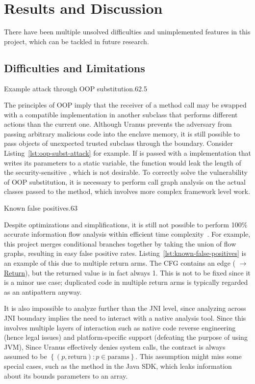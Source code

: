 \section{Results and Discussion}\label{sec:results-and-discussion}
There have been multiple unsolved difficulties and unimplemented features in this project,
which can be tackled in future research.

\subsection{Difficulties and Limitations}\label{subsec:difficulties-and-limitations}
{Example attack through OOP substitution}{.6}{2.5}

The principles of \ac{OOP} imply that the receiver of a method call
may be swapped with a compatible implementation in another subclass
that performs different actions than the current one.
Although Uranus prevents the adversary
from passing arbitrary malicious code into the enclave memory,
it is still possible to pass objects of unexpected trusted subclass
through the  boundary.
Consider Listing~\ref{lst:oop-subst-attack} for example.
If  is passed with a  implementation
that writes its parameters to a static variable,
the function would leak the length of the security-sensitive ,
which is not desirable.
To correctly solve the vulnerability of \ac{OOP} substitution,
it is necessary to perform call graph analysis on the actual classes passed to the method,
which involves more complex framework level work.

{Known false positives}{.6}{3}

Despite optimizations and simplifications,
it is still not possible to perform 100\% accurate information flow analysis
within efficient time complexity~\cite{SmithGeoffrey2007PoSI}.
For example, this project merges conditional branches together
by taking the union of flow graphs,
resulting in easy false positive rates.
Listing~\ref{lst:known-false-positives} is an example of this  due to multiple return arms.
The CFG contains an edge ( $\to$ \underline{Return}),
but the returned value is in fact always 1.
This is not to be fixed since it is a minor use case;
duplicated code in multiple return arms
is typically regarded as an antipattern anyway.

It is also impossible to analyze further than the \ac{JNI} level,
since analyzing across \ac{JNI} boundary implies
the need to interact with a native analysis tool.
Since this involves multiple layers of interaction
such as native code reverse engineering (hence legal issues)
and platform-specific support (defeating the purpose of using \ac{JVM}),
Since Uranus effectively denies system calls,
the contract is always assumed to be
$\left\{ (p, \text{return}) : p \in \text{params} \right\}$.
This assumption might miss some special cases,
such as the  method in the Java \ac{SDK},
which leaks information about its bounds parameters to an array.

